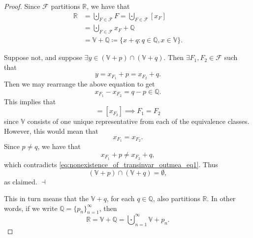 \documentclass[notoc,notitlepage]{tufte-book}
\begin{document}
\begin{proof}
  \noindent
   Since $\mathcal{F}$ partitions $\mathbb{R}$, we have that
  \begin{align*}
    \mathbb{R} &= \bigcupdot_{F \in \mathcal{F}} F = \bigcupdot_{F \in
                 \mathcal{F}} [x_F] \\
               &= \bigcupdot_{F \in \mathcal{F}} x_F + \mathbb{Q} \\
               &= \mathbb{V} + \mathbb{Q} \coloneqq \{ x + q : q \in \mathbb{Q},
                x \in \mathbb{V} \}.
  \end{align*}

  \noindent
    Suppose not, and suppose
  $\exists y \in (\mathbb{V} + p) \cap (\mathbb{V} + q)$. Then $\exists F_1, F_2
  \in \mathcal{F}$ such that
  \begin{equation}\label{eq:nonexistence_of_transinvar_outmea_eq1}
    y = x_{F_1} + p = x_{F_2} + q.
  \end{equation}
  Then we may rearrange the above equation to get
  \begin{equation*}
    x_{F_1} - x_{F_2} = q - p \in \mathbb{Q}.
  \end{equation*}
  This implies that
  \begin{equation*}
    [x_{F_1}] = [x_{F_2}] \implies F_1 = F_2
  \end{equation*}
  since $\mathbb{V}$ consists of one unique representative from each of the
  equivalence classes. However, this would mean that
  \begin{equation*}
    x_{F_1} = x_{F_2}.
  \end{equation*}
  Since $p \neq q$, we have that
  \begin{equation*}
    x_{F_1} + p \neq x_{F_2} + q,
  \end{equation*}
  which contradicts \cref{eq:nonexistence_of_transinvar_outmea_eq1}. Thus
  \begin{equation*}
    (\mathbb{V} + p) \cap (\mathbb{V} + q) = \emptyset,
  \end{equation*}
  as claimed. $\dashv$

  This in turn means that the $\mathbb{V} + q$, for each $q \in \mathbb{Q}$,
  also partitions $\mathbb{R}$. In other words, if we write $\mathbb{Q} = \{ p_n
  \}_{n=1}^{\infty}$, then
  \begin{equation*}
    \mathbb{R} = \mathbb{V} + \mathbb{Q} = \bigcupdot_{n=1}^{\infty} \mathbb{V}
    + p_n.
  \end{equation*}


\end{proof}
\end{document}
